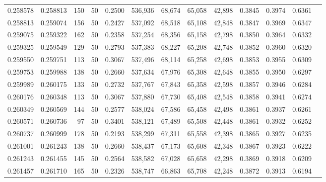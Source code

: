 \begin{tabular}{rrrrrrrrrrrrr}
0.258578 & 0.258813 &   150 &  50 &                                     0.2500 & 536,936 &  68,674 &  65,058 &  42,898 & 0.3845 & 0.3974 & 0.6361 \\
0.258813 & 0.259074 &   156 &  50 &                                     0.2427 & 537,092 &  68,518 &  65,108 &  42,848 & 0.3847 & 0.3969 & 0.6347 \\
0.259075 & 0.259322 &   162 &  50 &                                     0.2358 & 537,254 &  68,356 &  65,158 &  42,798 & 0.3850 & 0.3964 & 0.6332 \\
0.259325 & 0.259549 &   129 &  50 &                                     0.2793 & 537,383 &  68,227 &  65,208 &  42,748 & 0.3852 & 0.3960 & 0.6320 \\
0.259550 & 0.259751 &   113 &  50 &                                     0.3067 & 537,496 &  68,114 &  65,258 &  42,698 & 0.3853 & 0.3955 & 0.6309 \\
0.259753 & 0.259988 &   138 &  50 &                                     0.2660 & 537,634 &  67,976 &  65,308 &  42,648 & 0.3855 & 0.3950 & 0.6297 \\
0.259989 & 0.260175 &   133 &  50 &                                     0.2732 & 537,767 &  67,843 &  65,358 &  42,598 & 0.3857 & 0.3946 & 0.6284 \\
0.260176 & 0.260348 &   113 &  50 &                                     0.3067 & 537,880 &  67,730 &  65,408 &  42,548 & 0.3858 & 0.3941 & 0.6274 \\
0.260349 & 0.260569 &   144 &  50 &                                     0.2577 & 538,024 &  67,586 &  65,458 &  42,498 & 0.3861 & 0.3937 & 0.6261 \\
0.260571 & 0.260736 &    97 &  50 &                                     0.3401 & 538,121 &  67,489 &  65,508 &  42,448 & 0.3861 & 0.3932 & 0.6252 \\
0.260737 & 0.260999 &   178 &  50 &                                     0.2193 & 538,299 &  67,311 &  65,558 &  42,398 & 0.3865 & 0.3927 & 0.6235 \\
0.261001 & 0.261243 &   138 &  50 &                                     0.2660 & 538,437 &  67,173 &  65,608 &  42,348 & 0.3867 & 0.3923 & 0.6222 \\
0.261243 & 0.261455 &   145 &  50 &                                     0.2564 & 538,582 &  67,028 &  65,658 &  42,298 & 0.3869 & 0.3918 & 0.6209 \\
0.261457 & 0.261710 &   165 &  50 &                                     0.2326 & 538,747 &  66,863 &  65,708 &  42,248 & 0.3872 & 0.3913 & 0.6194 \\

\end{tabular}
